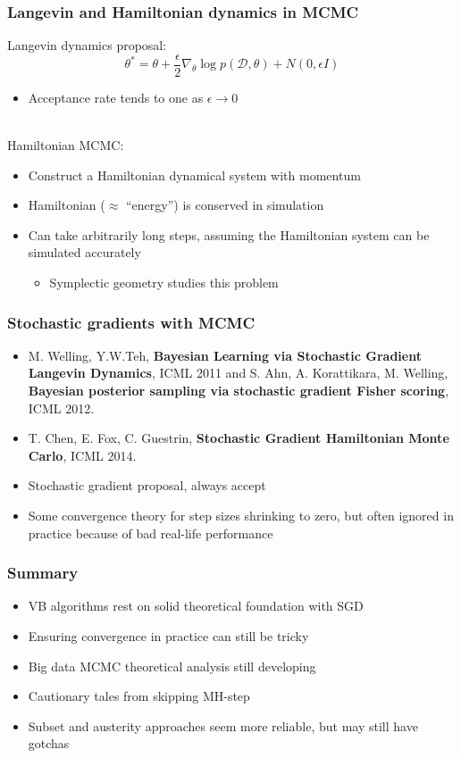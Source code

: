 \documentclass{beamer}
\newcommand{\dataset}{\mathcal{D}}
\newcommand{\parameters}{\theta}
\begin{document}
\begin{frame}
  \frametitle{Langevin and Hamiltonian dynamics in MCMC}

  Langevin dynamics proposal:
  $$ \parameters^* = \parameters + \frac{\epsilon}{2} \nabla_\parameters \log p(\dataset, \parameters) + N(0, \epsilon I) $$
  \begin{itemize}
  \item Acceptance rate tends to one as $\epsilon \rightarrow 0$
  \end{itemize}
  \mbox{}\\
  Hamiltonian MCMC:
  \begin{itemize}
  \item Construct a Hamiltonian dynamical system with momentum
  \item Hamiltonian ($\approx$ ``energy'') is conserved in simulation
  \item Can take arbitrarily long steps, assuming the Hamiltonian
    system can be simulated accurately
    \begin{itemize}
    \item Symplectic geometry studies this problem
    \end{itemize}
  \end{itemize}
\end{frame}

\begin{frame}
  \frametitle{Stochastic gradients with MCMC}

  \begin{itemize}
  \item M. Welling, Y.W.Teh, \textbf{Bayesian Learning via Stochastic Gradient Langevin Dynamics}, ICML 2011 and S. Ahn, A. Korattikara, M. Welling, \textbf{Bayesian posterior sampling via stochastic gradient Fisher scoring}, ICML 2012.
  \item T. Chen, E. Fox, C. Guestrin, \textbf{Stochastic Gradient Hamiltonian Monte Carlo}, ICML 2014.
  \end{itemize}

  \begin{itemize}
  \item Stochastic gradient proposal, always accept
  \item Some convergence theory for step sizes shrinking to zero, but
    often ignored in practice because of bad real-life performance
  \end{itemize}
\end{frame}


\begin{frame}
  \frametitle{Summary}

  \begin{itemize}
  \item VB algorithms rest on solid theoretical foundation with SGD
  \item Ensuring convergence in practice can still be tricky
  \item Big data MCMC theoretical analysis still developing
  \item Cautionary tales from skipping MH-step
  \item Subset and austerity approaches seem more reliable, but may
    still have gotchas
  \end{itemize}
\end{frame}
\end{document}
